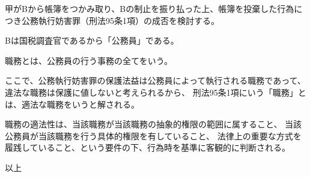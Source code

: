 \documentclass[11pt]{jsarticle}
\title{\vspace{-30mm}{\textgt{\Large{\fbox{11} 帳簿の紙吹雪}}}}
\date{\vspace{-15mm}}
\begin{document}
\maketitle

\sectionB{}
	甲がBから帳簿をつかみ取り、Bの制止を振り払った上、帳簿を投棄した行為につき公務執行妨害罪（刑法95条1項）の成否を検討する。
	
	\sectionC{}
		Bは国税調査官であるから「公務員」である。
		
	\sectionC{}
		職務とは、公務員の行う事務の全てをいう。
		
		ここで、公務執行妨害罪の保護法益は公務員によって執行される職務であって、
		違法な職務は保護に値しないと考えられるから、
		刑法95条1項にいう「職務」とは、適法な職務をいうと解される。
		
		職務の適法性は、当該職務が当該職務の抽象的権限の範囲に属すること、
		当該公務員が当該職務を行う具体的権限を有していること、
		法律上の重要な方式を履践していること、という要件の下、行為時を基準に客観的に判断される。






\begin{flushright}
	以上
\end{flushright}
	
\end{document}
